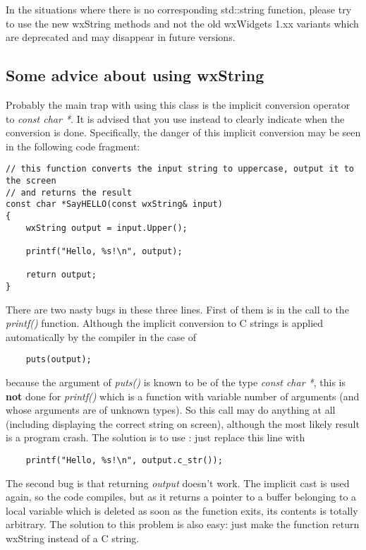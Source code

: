 In the situations where there is no corresponding std::string function, please
try to use the new wxString methods and not the old wxWidgets 1.xx variants
which are deprecated and may disappear in future versions.

\subsection{Some advice about using wxString}\label{wxstringadvices}

Probably the main trap with using this class is the implicit conversion operator to 
{\it const char *}. It is advised that you use 
instead to clearly indicate when the conversion is done. Specifically, the
danger of this implicit conversion may be seen in the following code fragment:

\begin{verbatim}
// this function converts the input string to uppercase, output it to the screen
// and returns the result
const char *SayHELLO(const wxString& input)
{
    wxString output = input.Upper();

    printf("Hello, %s!\n", output);

    return output;
}
\end{verbatim}

There are two nasty bugs in these three lines. First of them is in the call to the 
{\it printf()} function. Although the implicit conversion to C strings is applied
automatically by the compiler in the case of

\begin{verbatim}
    puts(output);
\end{verbatim}

because the argument of {\it puts()} is known to be of the type {\it const char *},
this is {\bf not} done for {\it printf()} which is a function with variable
number of arguments (and whose arguments are of unknown types). So this call may
do anything at all (including displaying the correct string on screen), although
the most likely result is a program crash. The solution is to use 
: just replace this line with

\begin{verbatim}
    printf("Hello, %s!\n", output.c_str());
\end{verbatim}

The second bug is that returning {\it output} doesn't work. The implicit cast is
used again, so the code compiles, but as it returns a pointer to a buffer
belonging to a local variable which is deleted as soon as the function exits,
its contents is totally arbitrary. The solution to this problem is also easy:
just make the function return wxString instead of a C string.

